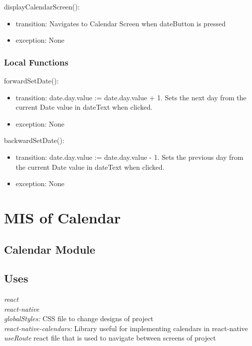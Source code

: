 \documentclass[12pt, titlepage]{article}
\begin{document}
\noindent displayCalendarScreen():
\begin{itemize}
	\item transition: Navigates to Calendar Screen when dateButton is pressed
	\item exception: None 
\end{itemize}

\subsubsection{Local Functions}

\noindent forwardSetDate():
\begin{itemize}
	\item transition: date.day.value := date.day.value + 1. Sets the next day from the current Date value in dateText when clicked.  
	\item exception: None 
\end{itemize}

\noindent backwardSetDate():
\begin{itemize}
	\item transition: date.day.value := date.day.value - 1. Sets the previous day from the current Date value in dateText when clicked. 
	\item exception: None 
\end{itemize}

\section{MIS of Calendar} \label{Module} 

\subsection{Calendar Module}

\subsection{Uses}
{\textit{react}}\\
{\textit{react-native}}\\
{\textit{globalStyles:} CSS file to change designs of project}\\
{\textit{react-native-calendars:} Library useful for implementing calendars in react-native}\\
{\textit{useRoute} react file that is used to navigate between screens of project}\\
\end{document}
